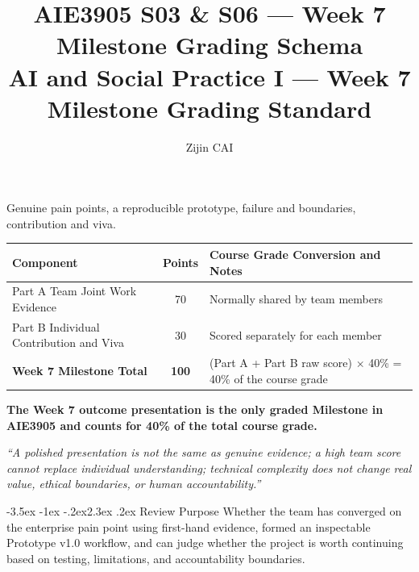 \documentclass[11pt]{article}
\title{\Large \sffamily\bfseries AIE3905 S03 \& S06 --- Week 7 Milestone Grading Schema\\[0.4em]
       \large \sffamily\bfseries AI and Social Practice I --- Week 7 Milestone Grading Standard}
\author{Zijin CAI}
\makeatletter
\renewcommand\section{\@startsection{section}{1}{\z@}%
    {-3.5ex \@plus -1ex \@minus -.2ex}{2.3ex \@plus.2ex}%
    {\normalfont\Large\sffamily\bfseries}}
\newcommand{\formaltable}{%
  \small
  \setlength{\tabcolsep}{5pt}%
  \renewcommand{\arraystretch}{1.2}%
  \setlength{\arrayrulewidth}{0.4pt}%
}
\renewcommand{\arraystretch}{1.2}
\makeatother
\begin{document}
\makeatletter
\renewcommand{\maketitle}{
  \begin{center}
    {\Large \@title \par}
  \end{center}
}
\makeatother

\maketitle

\begin{center}
\small Genuine pain points, a reproducible prototype, failure and boundaries, contribution and viva.
\end{center}
\vspace{0.2cm}

\begin{center}
\formaltable
\begin{tabularx}{\textwidth}{|Y|c|Y|}
\hline
\textbf{Component} & \textbf{Points} & \textbf{Course Grade Conversion and Notes} \\ \hline
Part A Team Joint Work Evidence & 70 & Normally shared by team members \\ \hline
Part B Individual Contribution and Viva & 30 & Scored separately for each member \\ \hline
\textbf{Week 7 Milestone Total} & \textbf{100} & (Part A + Part B raw score) $\times$ 40\% = 40\% of the course grade \\ \hline
\end{tabularx}
\end{center}

\noindent\textbf{The Week 7 outcome presentation is the only graded Milestone in AIE3905 and counts for 40\% of the total course grade.}

\noindent\textit{``A polished presentation is not the same as genuine evidence; a high team score cannot replace individual understanding; technical complexity does not change real value, ethical boundaries, or human accountability.''}

\section{Review Purpose}
Whether the team has converged on the enterprise pain point using first-hand evidence, formed an inspectable Prototype v1.0 workflow, and can judge whether the project is worth continuing based on testing, limitations, and accountability boundaries.
\end{document}
